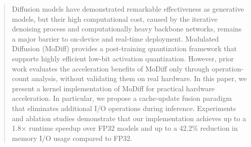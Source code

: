 \begin{abstract}

    Diffusion models have demonstrated remarkable effectiveness as generative models, but their high computational cost, caused by the iterative denoising process and computationally heavy backbone networks, remains a major barrier to on-device and real-time deployment. Modulated Diffusion (MoDiff) provides a post-training quantization framework that supports highly efficient low-bit activation quantization. However, prior work evaluates the acceleration benefits of MoDiff only through operation-count analysis, without validating them on real hardware. In this paper, we present a kernel implementation of MoDiff for practical hardware acceleration. In particular, we propose a cache-update fusion paradigm that eliminates additional I/O operations during inference. Experiments and ablation studies demonstrate that our implementation achieves up to a 1.8× runtime speedup over FP32 models and up to a 42.2\% reduction in memory I/O usage compared to FP32.
\end{abstract}